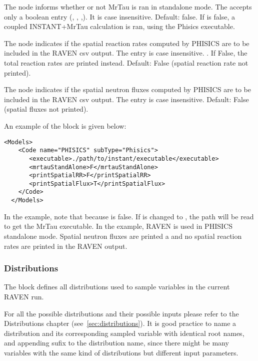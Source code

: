 The  node informs whether or not MrTau is ran in standalone mode. The
 accepts only a boolean entry (, , 
,). It is case insensitive.
Default: false.
If  is false, a coupled INSTANT+MrTau calculation is ran, using the Phisics executable.

The  node indicates if the spatial reaction rates computed by PHISICS are to be included
in the RAVEN csv output. The entry is case insensitive.
. If False, the total reaction rates are printed instead. Default: False (spatial reaction rate not printed).

The  node indicates if the spatial neutron fluxes computed by PHISICS are to be included in the RAVEN csv output. The entry is case insensitive. Default: False (spatial fluxes not printed).

An example of the  block is given below:

\begin{lstlisting}[style=XML]
  <Models>
    <Code name="PHISICS" subType="Phisics">
       <executable>./path/to/instant/executable</executable>
       <mrtauStandAlone>F</mrtauStandAlone>
       <printSpatialRR>F</printSpatialRR>
       <printSpatialFlux>T</printSpatialFlux>
    </Code>
  </Models>
\end{lstlisting}
In the example, note that because  is false.
If   is changed to , the path  will be read to get the MrTau executable.
In the example, RAVEN is used in PHISICS standalone mode. Spatial neutron fluxes are printed a and no spatial reaction rates are printed in the RAVEN output.

\subsubsection{Distributions}
The  block defines all distributions used to
sample variables in the current RAVEN run.

For all the possible distributions and their possible inputs please
refer to the Distributions chapter (see~\ref{sec:distributions}).
%
It is good practice to name a distribution and its corresponding sampled variable with identical root names, and appending sufix to the distribution name, since there might be many variables with the
same kind of distributions but different input parameters.

